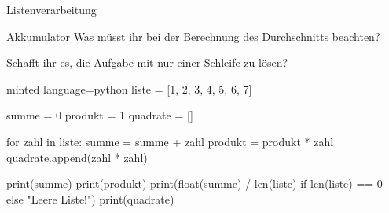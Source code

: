 \begin{task}[points=auto]{Listenverarbeitung}
\begin{subtask*}[points=0]{Akkumulator }
        Was müsst ihr bei der Berechnung des Durchschnitts beachten?

        \begin{infoBox}

            Schafft ihr es, die Aufgabe mit nur einer Schleife zu lösen?
        \end{infoBox}

        \begin{solution}
            \begin{codeBlock}[]{minted language=python}
                liste = [1, 2, 3, 4, 5, 6, 7]

                summe = 0
                produkt = 1
                quadrate = []

                for zahl in liste:
                    summe = summe + zahl
                    produkt = produkt * zahl
                    quadrate.append(zahl * zahl)

                print(summe)
                print(produkt)
                print(float(summe) / len(liste) if len(liste) == 0 else "Leere Liste!")
                print(quadrate)
            \end{codeBlock}
        \end{solution}
    \end{subtask*}
\end{task}

